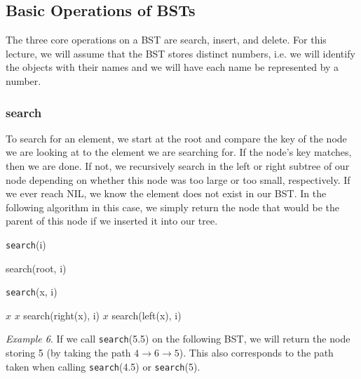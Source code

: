 \documentclass [12pt]{article}
\begin{document}
\subsection{Basic Operations of BSTs} 
The three core operations on a BST are search, insert, and delete. For this lecture, we will assume that the BST stores distinct numbers, i.e. we will identify the objects with their names and we will have each name be represented by a number.

\subsubsection{search} 
To search for an element, we start at the root and compare the key of the node we are looking at to the element we are searching for. If the node's key matches, then we are done. If not, we recursively search in the left or right subtree of our node depending on whether this node was too large or too small, respectively. If we ever reach NIL, we know the element does not exist in our BST. In the following algorithm in this case, we simply return the node that would be the parent of this node if we inserted it into our tree.


\begin{algorithm}
\caption{\texttt{search}(i)}\label{alg:bst_search}
\begin{algorithmic}
\RETURN search(root, i)
\end{algorithmic}
\end{algorithm}

\begin{algorithm}
\caption{\texttt{search}(x, i)}\label{alg:bst_search_substree}
\begin{algorithmic}
  \RETURN $x$
    \RETURN $x$
  \ENDIF
  \RETURN search(right(x), i)
    \RETURN $x$
  \ENDIF
  \RETURN search(left(x), i)
\ENDIF
\end{algorithmic}
\end{algorithm}

\textit{Example 6}. If we call \texttt{search}(5.5) on the following BST, we will return the node storing 5 (by taking the path $4 \to 6 \to 5$). This also corresponds to the path taken when calling \texttt{search}(4.5) or
\texttt{search}(5).
\end{document}
